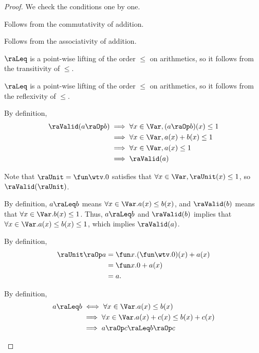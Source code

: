 \begin{proof}
  We check the conditions one by one.
  \begin{induction}
    \step[Condition~$a \raOp b = b \raOp a$]
      Follows from the commutativity of addition.

    \step[Condition~$(a \raOp b) \raOp c = a \raOp (b \raOp c)$]
      Follows from the associativity of addition.

      $\raLeq$ is a point-wise lifting of the order $\leq$ on arithmetics,
      so it follows from the transitivity of $\leq$.

      $\raLeq$ is a point-wise lifting of the order $\leq$ on arithmetics,
      so it follows from the reflexivity of $\leq$.

      By definition,
      \begin{align*}
        \raValid(a \raOp b)
        &\implies \forall x \in \Var, (a \raOp b)(x) \leq 1 \\
        &\implies \forall x \in \Var, a(x) + b(x) \leq 1 \\
        &\implies \forall x \in \Var, a(x) \leq 1 \\
        &\implies \raValid(a)
      \end{align*}

      Note that $\raUnit = \fun \wtv. 0$ satisfies that
      $\forall x \in \Var, \raUnit(x) \leq 1$,
      so $\raValid(\raUnit)$.

      By definition,
      $a \raLeq b$ means
      $\forall x \in \Var. a(x) \leq b(x)$,
      and $\raValid(b)$ means that
      $\forall x \in \Var. b(x) \leq 1$.
      Thus, $a \raLeq b$ and $\raValid(b)$ implies that
      $\forall x \in \Var. a(x) \leq b(x) \leq 1$,
      which implies $\raValid(a)$.

    \step[Condition~$\raUnit \raOp a = a$]
      By definition,
      \begin{align*}
        \raUnit \raOp a
        &= \fun x. (\fun \wtv. 0)(x) + a(x) \\
        &= \fun x. 0 + a(x) \\
        &= a.
      \end{align*}

      By definition,
      \begin{align*}
        a \raLeq b
        &\iff \forall x \in \Var. a(x) \leq b(x) \\
        &\implies \forall x \in \Var. a(x) + c(x) \leq b(x) + c(x) \\
        &\implies a \raOp c \raLeq b \raOp c
        \tag*{\qedhere}
      \end{align*}
  \end{induction}
\end{proof}


